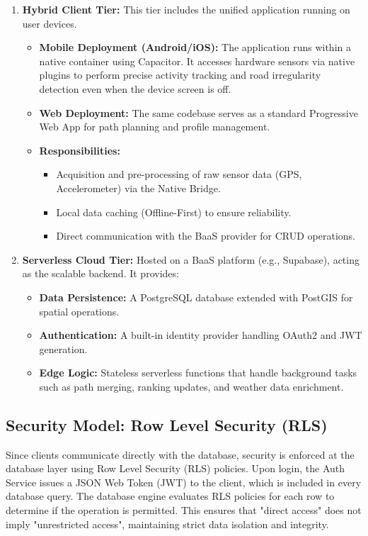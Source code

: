 \begin{enumerate}
    \item \textbf{Hybrid Client Tier:} This tier includes the unified application running on user devices.
    \begin{itemize}
        \item \textbf{Mobile Deployment (Android/iOS):} The application runs within a native container using Capacitor. It accesses hardware sensors via native plugins to perform precise activity tracking and road irregularity detection even when the device screen is off.
        \item \textbf{Web Deployment:} The same codebase serves as a standard Progressive Web App for path planning and profile management.
        \item \textbf{Responsibilities:}
        \begin{itemize}
            \item Acquisition and pre-processing of raw sensor data (GPS, Accelerometer) via the Native Bridge.
            \item Local data caching (Offline-First) to ensure reliability.
            \item Direct communication with the BaaS provider for CRUD operations.
        \end{itemize}
    \end{itemize}

    \item \textbf{Serverless Cloud Tier:} Hosted on a BaaS platform (e.g., Supabase), acting as the scalable backend. It provides:
    \begin{itemize}
        \item \textbf{Data Persistence:} A PostgreSQL database extended with PostGIS for spatial operations.
        \item \textbf{Authentication:} A built-in identity provider handling OAuth2 and JWT generation.
        \item \textbf{Edge Logic:} Stateless serverless functions that handle background tasks such as path merging, ranking updates, and weather data enrichment.
    \end{itemize}
\end{enumerate}

\subsection{Security Model: Row Level Security (RLS)}
Since clients communicate directly with the database, security is enforced at the database layer using Row Level Security (RLS) policies.
Upon login, the Auth Service issues a JSON Web Token (JWT) to the client, which is included in every database query. The database engine evaluates RLS policies for each row to determine if the operation is permitted. This ensures that "direct access" does not imply "unrestricted access", maintaining strict data isolation and integrity.

